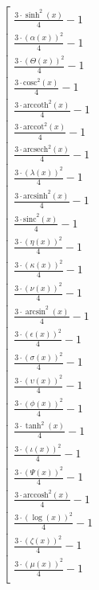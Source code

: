 \begin{equation}
\left[
\begin{array}{c}
\frac{3 \cdot \sinh^{2}\left( x \right)}{4} - 1 \\
\frac{3 \cdot \left( \alpha\left( x \right) \right)^{2}}{4} - 1 \\
\frac{3 \cdot \left( \Theta\left( x \right) \right)^{2}}{4} - 1 \\
\frac{3 \cdot \mathrm{cosc}^{2}\left( x \right)}{4} - 1 \\
\frac{3 \cdot \mathrm{arccoth}^{2}\left( x \right)}{4} - 1 \\
\frac{3 \cdot \mathrm{arccot}^{2}\left( x \right)}{4} - 1 \\
\frac{3 \cdot \mathrm{arcsech}^{2}\left( x \right)}{4} - 1 \\
\frac{3 \cdot \left( \lambda\left( x \right) \right)^{2}}{4} - 1 \\
\frac{3 \cdot \mathrm{arcsinh}^{2}\left( x \right)}{4} - 1 \\
\frac{3 \cdot \mathrm{sinc}^{2}\left( x \right)}{4} - 1 \\
\frac{3 \cdot \left( \eta\left( x \right) \right)^{2}}{4} - 1 \\
\frac{3 \cdot \left( \kappa\left( x \right) \right)^{2}}{4} - 1 \\
\frac{3 \cdot \left( \nu\left( x \right) \right)^{2}}{4} - 1 \\
\frac{3 \cdot \arcsin^{2}\left( x \right)}{4} - 1 \\
\frac{3 \cdot \left( \epsilon\left( x \right) \right)^{2}}{4} - 1 \\
\frac{3 \cdot \left( \sigma\left( x \right) \right)^{2}}{4} - 1 \\
\frac{3 \cdot \left( \upsilon\left( x \right) \right)^{2}}{4} - 1 \\
\frac{3 \cdot \left( \phi\left( x \right) \right)^{2}}{4} - 1 \\
\frac{3 \cdot \tanh^{2}\left( x \right)}{4} - 1 \\
\frac{3 \cdot \left( \iota\left( x \right) \right)^{2}}{4} - 1 \\
\frac{3 \cdot \left( \Psi\left( x \right) \right)^{2}}{4} - 1 \\
\frac{3 \cdot \mathrm{arccosh}^{2}\left( x \right)}{4} - 1 \\
\frac{3 \cdot \left( \log\left( x \right) \right)^{2}}{4} - 1 \\
\frac{3 \cdot \left( \zeta\left( x \right) \right)^{2}}{4} - 1 \\
\frac{3 \cdot \left( \mu\left( x \right) \right)^{2}}{4} - 1 \\

\end{array}
\end{equation}
